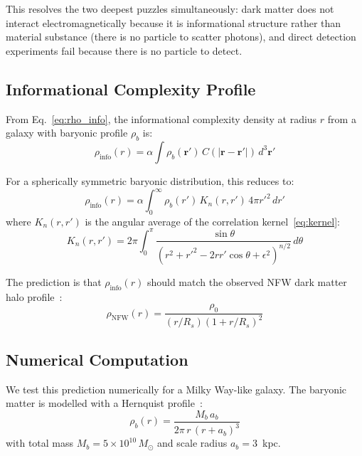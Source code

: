 \documentclass[12pt,a4paper]{article}
\begin{document}
This resolves the two deepest puzzles simultaneously: dark matter does not interact electromagnetically because it is informational structure rather than material substance (there is no particle to scatter photons), and direct detection experiments fail because there is no particle to detect.

\subsection{Informational Complexity Profile}

From Eq.~\eqref{eq:rho_info}, the informational complexity density at radius $r$ from a galaxy with baryonic profile $\rho_b$ is:
\begin{equation}
    \rho_{\mathrm{info}}(r) = \alpha \int \rho_b(\mathbf{r}') \, C(|\mathbf{r} - \mathbf{r}'|) \, d^3\mathbf{r}'
    \label{eq:dark_matter_profile}
\end{equation}

For a spherically symmetric baryonic distribution, this reduces to:
\begin{equation}
    \rho_{\mathrm{info}}(r) = \alpha \int_0^\infty \rho_b(r') \, K_n(r, r') \, 4\pi r'^2 \, dr'
\end{equation}
where $K_n(r, r')$ is the angular average of the correlation kernel~\eqref{eq:kernel}:
\begin{equation}
    K_n(r, r') = 2\pi \int_0^\pi \frac{\sin\theta}{(r^2 + r'^2 - 2rr'\cos\theta + \epsilon^2)^{n/2}} \, d\theta
\end{equation}

The prediction is that $\rho_{\mathrm{info}}(r)$ should match the observed NFW dark matter halo profile~\cite{Navarro1996}:
\begin{equation}
    \rho_{\mathrm{NFW}}(r) = \frac{\rho_0}{(r/R_s)(1 + r/R_s)^2}
    \label{eq:nfw}
\end{equation}

\subsection{Numerical Computation}
\label{sec:nfw_calculation}

We test this prediction numerically for a Milky Way-like galaxy. The baryonic matter is modelled with a Hernquist profile~\cite{Hernquist1990}:
\begin{equation}
    \rho_b(r) = \frac{M_b \, a_b}{2\pi \, r \, (r + a_b)^3}
\end{equation}
with total mass $M_b = 5 \times 10^{10} \, M_\odot$ and scale radius $a_b = 3$~kpc.
\end{document}
